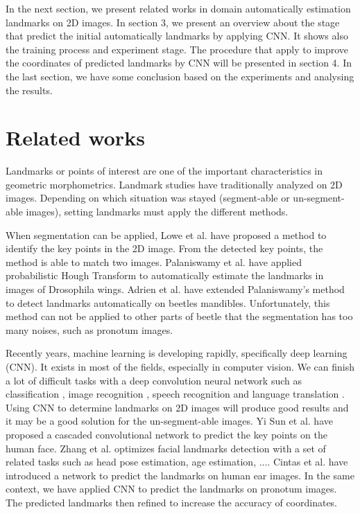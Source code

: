 \documentclass[10pt]{article}
\begin{document}
In the next section, we present related works in domain automatically estimation landmarks on 2D images. In section 3, we present an overview about the stage that predict the initial automatically landmarks by applying CNN. It shows also the training process and experiment stage. The procedure that apply to improve the coordinates of predicted landmarks by CNN will be presented in section 4. In the last section, we have some conclusion based on the experiments and analysing the results.

\section{Related works}
Landmarks or points of interest are one of the important characteristics in geometric morphometrics. Landmark studies have traditionally analyzed on 2D images. Depending on which situation was stayed (segment-able or un-segment-able images), setting landmarks must apply the different methods.

When segmentation can be applied, Lowe et al. \cite{lowe2004distinctive} have proposed a method to identify the key points in the 2D image. From the detected key points, the method is able to match two images. Palaniswamy et al. \cite{palaniswamy2010automatic} have applied probabilistic Hough Transform to automatically estimate the landmarks in images of Drosophila wings. Adrien et al. \cite{le2017maelab} have extended Palaniswamy's method to detect landmarks automatically on beetles mandibles. Unfortunately, this method can not be applied to other parts of beetle that the segmentation has too many noises, such as pronotum images.

Recently years, machine learning is developing rapidly, specifically deep learning (CNN). It exists in most of the fields, especially in computer vision. We can finish a lot of difficult tasks with a deep convolution neural network such as classification \cite{krizhevsky2012imagenet, ciregan2012multi}, image recognition \cite{szegedy2015going, farabet2013learning, li2015convolutional}, speech recognition \cite{mikolov2011strategies, hinton2012deep} and language translation \cite{jean2014using, sutskever2014sequence}. Using CNN to determine landmarks on 2D images will produce good results and it may be a good solution for the un-segment-able images. Yi Sun et al. \cite{sun2013deep} have proposed a cascaded convolutional network to predict the key points on the human face. Zhang et al. \cite{zhang2014facial} optimizes facial landmarks detection with a set of related tasks such as head pose estimation, age estimation, .... Cintas et al. \cite{cintas2016automatic} have introduced a network to predict the landmarks on human ear images. In the same context, we have applied CNN to predict the landmarks on pronotum images. The predicted landmarks then refined to increase the accuracy of coordinates.
\end{document}
